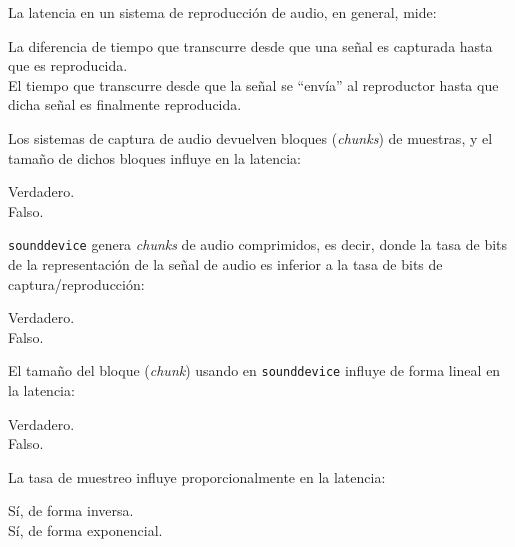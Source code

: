 \documentclass[legalpaper, 12pt, addpoints]{exam}
\begin{document}
\begin{questions}
\question La latencia en un sistema de reproducción de audio, en general, mide:

\begin{oneparchoices}
  \choice La diferencia de tiempo que transcurre desde que una señal es capturada hasta que es reproducida.\\
  \choice El tiempo que transcurre desde que la señal se ``envía'' al
  reproductor hasta que dicha señal es finalmente reproducida.
\end{oneparchoices}
  
\vspace{0.10in}

\question Los sistemas de captura de audio devuelven bloques (\emph{chunks})
de muestras, y el tamaño de dichos bloques influye en la latencia:

\begin{oneparchoices}
  \choice Verdadero.\\
  \choice Falso.
\end{oneparchoices}
  
\vspace{0.10in}

\question \texttt{sounddevice} genera \emph{chunks} de audio
comprimidos, es decir, donde la tasa de bits de la representación de
la señal de audio es inferior a la tasa de bits de
captura/reproducción:

\begin{oneparchoices}
  \choice Verdadero.\\
  \choice Falso.
\end{oneparchoices}
  
\vspace{0.10in}

\question El tamaño del bloque (\emph{chunk}) usando en \texttt{sounddevice}
influye de forma lineal en la latencia:

\begin{oneparchoices}
  \choice Verdadero.\\
  \choice Falso.
\end{oneparchoices}
  
\vspace{0.10in}

\question La tasa de muestreo influye proporcionalmente en la latencia:

\begin{oneparchoices}
  \choice Sí, de forma inversa.\\
  \choice Sí, de forma exponencial.
\end{oneparchoices}
  

\end{questions}
\end{document}
